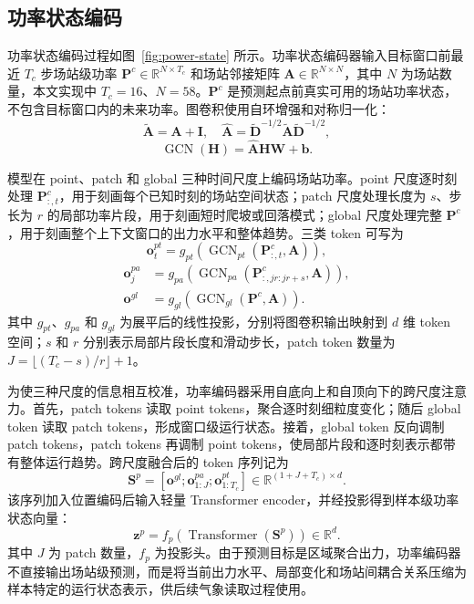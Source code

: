 \subsection{功率状态编码}

功率状态编码过程如图~\ref{fig:power-state} 所示。功率状态编码器输入目标窗口前最近 \(T_c\) 步场站级功率 \(\mathbf{P}^{c}\in\mathbb{R}^{N\times T_c}\) 和场站邻接矩阵 \(\mathbf{A}\in\mathbb{R}^{N\times N}\)，其中 \(N\) 为场站数量，本文实现中 \(T_c=16\)、\(N=58\)。\(\mathbf{P}^{c}\) 是预测起点前真实可用的场站功率状态，不包含目标窗口内的未来功率。图卷积使用自环增强和对称归一化：
\begin{equation}
\tilde{\mathbf{A}}=\mathbf{A}+\mathbf{I},\quad
\hat{\mathbf{A}}=\tilde{\mathbf{D}}^{-1/2}\tilde{\mathbf{A}}\tilde{\mathbf{D}}^{-1/2},
\end{equation}
\begin{equation}
\operatorname{GCN}(\mathbf{H})=\hat{\mathbf{A}}\mathbf{H}\mathbf{W}+\mathbf{b}.
\end{equation}

模型在 point、patch 和 global 三种时间尺度上编码场站功率。point 尺度逐时刻处理 \(\mathbf{P}^{c}_{:,t}\)，用于刻画每个已知时刻的场站空间状态；patch 尺度处理长度为 \(s\)、步长为 \(r\) 的局部功率片段，用于刻画短时爬坡或回落模式；global 尺度处理完整 \(\mathbf{P}^{c}\)，用于刻画整个上下文窗口的出力水平和整体趋势。三类 token 可写为
\begin{equation}
\mathbf{o}^{pt}_{t}=g_{pt}(\operatorname{GCN}_{pt}(\mathbf{P}^{c}_{:,t},\mathbf{A})),
\end{equation}
\begin{equation}
\begin{aligned}
\mathbf{o}^{pa}_{j}
&=g_{pa}(\operatorname{GCN}_{pa}(\mathbf{P}^{c}_{:,jr:jr+s},\mathbf{A})),\\
\mathbf{o}^{gl}
&=g_{gl}(\operatorname{GCN}_{gl}(\mathbf{P}^{c},\mathbf{A})).
\end{aligned}
\end{equation}
其中 \(g_{pt}\)、\(g_{pa}\) 和 \(g_{gl}\) 为展平后的线性投影，分别将图卷积输出映射到 \(d\) 维 token 空间；\(s\) 和 \(r\) 分别表示局部片段长度和滑动步长，patch token 数量为 \(J=\lfloor (T_c-s)/r\rfloor+1\)。

为使三种尺度的信息相互校准，功率编码器采用自底向上和自顶向下的跨尺度注意力。首先，patch tokens 读取 point tokens，聚合逐时刻细粒度变化；随后 global token 读取 patch tokens，形成窗口级运行状态。接着，global token 反向调制 patch tokens，patch tokens 再调制 point tokens，使局部片段和逐时刻表示都带有整体运行趋势。跨尺度融合后的 token 序列记为
\begin{equation}
\mathbf{S}^{p}=[\mathbf{o}^{gl};\mathbf{o}^{pa}_{1:J};\mathbf{o}^{pt}_{1:T_c}]\in\mathbb{R}^{(1+J+T_c)\times d}.
\end{equation}
该序列加入位置编码后输入轻量 Transformer encoder，并经投影得到样本级功率状态向量：
\begin{equation}
\mathbf{z}^{p}=f_{p}(\operatorname{Transformer}(\mathbf{S}^{p}))
\in\mathbb{R}^{d}.
\end{equation}
其中 \(J\) 为 patch 数量，\(f_p\) 为投影头。由于预测目标是区域聚合出力，功率编码器不直接输出场站级预测，而是将当前出力水平、局部变化和场站间耦合关系压缩为样本特定的运行状态表示，供后续气象读取过程使用。

